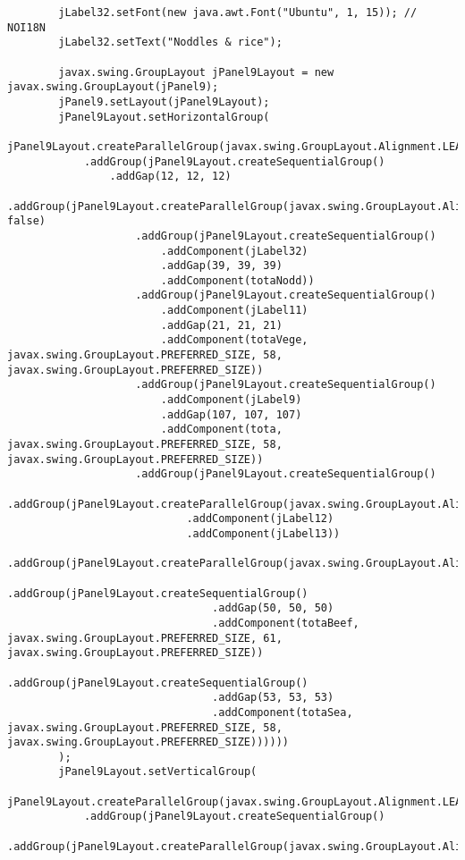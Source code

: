 \documentclass[12pt,a4paper]{article}
\begin{document}
\begin{lstlisting}
        jLabel32.setFont(new java.awt.Font("Ubuntu", 1, 15)); // NOI18N
        jLabel32.setText("Noddles & rice");

        javax.swing.GroupLayout jPanel9Layout = new javax.swing.GroupLayout(jPanel9);
        jPanel9.setLayout(jPanel9Layout);
        jPanel9Layout.setHorizontalGroup(
            jPanel9Layout.createParallelGroup(javax.swing.GroupLayout.Alignment.LEADING)
            .addGroup(jPanel9Layout.createSequentialGroup()
                .addGap(12, 12, 12)
                .addGroup(jPanel9Layout.createParallelGroup(javax.swing.GroupLayout.Alignment.LEADING, false)
                    .addGroup(jPanel9Layout.createSequentialGroup()
                        .addComponent(jLabel32)
                        .addGap(39, 39, 39)
                        .addComponent(totaNodd))
                    .addGroup(jPanel9Layout.createSequentialGroup()
                        .addComponent(jLabel11)
                        .addGap(21, 21, 21)
                        .addComponent(totaVege, javax.swing.GroupLayout.PREFERRED_SIZE, 58, javax.swing.GroupLayout.PREFERRED_SIZE))
                    .addGroup(jPanel9Layout.createSequentialGroup()
                        .addComponent(jLabel9)
                        .addGap(107, 107, 107)
                        .addComponent(tota, javax.swing.GroupLayout.PREFERRED_SIZE, 58, javax.swing.GroupLayout.PREFERRED_SIZE))
                    .addGroup(jPanel9Layout.createSequentialGroup()
                        .addGroup(jPanel9Layout.createParallelGroup(javax.swing.GroupLayout.Alignment.LEADING)
                            .addComponent(jLabel12)
                            .addComponent(jLabel13))
                        .addGroup(jPanel9Layout.createParallelGroup(javax.swing.GroupLayout.Alignment.LEADING)
                            .addGroup(jPanel9Layout.createSequentialGroup()
                                .addGap(50, 50, 50)
                                .addComponent(totaBeef, javax.swing.GroupLayout.PREFERRED_SIZE, 61, javax.swing.GroupLayout.PREFERRED_SIZE))
                            .addGroup(jPanel9Layout.createSequentialGroup()
                                .addGap(53, 53, 53)
                                .addComponent(totaSea, javax.swing.GroupLayout.PREFERRED_SIZE, 58, javax.swing.GroupLayout.PREFERRED_SIZE))))))
        );
        jPanel9Layout.setVerticalGroup(
            jPanel9Layout.createParallelGroup(javax.swing.GroupLayout.Alignment.LEADING)
            .addGroup(jPanel9Layout.createSequentialGroup()
                .addGroup(jPanel9Layout.createParallelGroup(javax.swing.GroupLayout.Alignment.LEADING)

\end{lstlisting}
\end{document}
